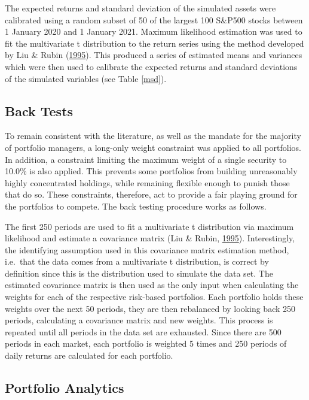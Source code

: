 \documentclass[11pt,preprint, authoryear]{elsarticle}
\numberwithin{equation}{section}
\numberwithin{figure}{section}
\numberwithin{table}{section}
\begin{document}
The expected returns and standard deviation of the simulated assets were
calibrated using a random subset of 50 of the largest 100 S\&P500 stocks
between 1 January 2020 and 1 January 2021. Maximum likelihood estimation
was used to fit the multivariate t distribution to the return series
using the method developed by Liu \& Rubin
(\protect\hyperlink{ref-liu1995}{1995}). This produced a series of
estimated means and variances which were then used to calibrate the
expected returns and standard deviations of the simulated variables (see
Table \ref{msd}).

\hypertarget{back-tests}{%
\subsection{\texorpdfstring{Back Tests
\label{backtest}}{Back Tests }}\label{back-tests}}

To remain consistent with the literature, as well as the mandate for the
majority of portfolio managers, a long-only weight constraint was
applied to all portfolios. In addition, a constraint limiting the
maximum weight of a single security to 10.0\% is also applied. This
prevents some portfolios from building unreasonably highly concentrated
holdings, while remaining flexible enough to punish those that do so.
These constraints, therefore, act to provide a fair playing ground for
the portfolios to compete. The back testing procedure works as follows.

The first 250 periods are used to fit a multivariate t distribution via
maximum likelihood and estimate a covariance matrix (Liu \& Rubin,
\protect\hyperlink{ref-liu1995}{1995}). Interestingly, the identifying
assumption used in this covariance matrix estimation method, i.e.~that
the data comes from a multivariate t distribution, is correct by
definition since this is the distribution used to simulate the data set.
The estimated covariance matrix is then used as the only input when
calculating the weights for each of the respective risk-based
portfolios. Each portfolio holds these weights over the next 50 periods,
they are then rebalanced by looking back 250 periods, calculating a
covariance matrix and new weights. This process is repeated until all
periods in the data set are exhausted. Since there are 500 periods in
each market, each portfolio is weighted 5 times and 250 periods of daily
returns are calculated for each portfolio.

\hypertarget{portfolio-analytics}{%
\subsection{\texorpdfstring{Portfolio Analytics
\label{portmet}}{Portfolio Analytics }}\label{portfolio-analytics}}
\end{document}
